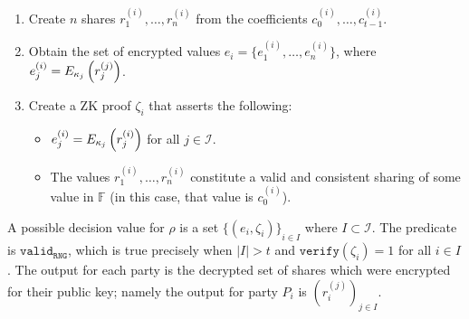 \documentclass{article}
\theoremstyle{remark}
\newcommand{\F}{\mathbb{F}}
\begin{document}
\begin{enumerate}
	\item Create $n$ shares $r_1^{(i)}, \ldots, r_n^{(i)}$ from the
		coefficients $c_0^{(i)}, \ldots, c_{t-1}^{(i)}$.
	\item Obtain the set of encrypted values $e_i = \{e_1^{(i)},
		\ldots, e_n^{(i)}\}$, where $e_j^{(i)} =
		E_{\kappa_j}\left(r_j^{(j)}\right)$.
	\item Create a ZK proof $\zeta_i$ that asserts the following:
		\begin{itemize}
			\item $e_j^{(i)} = E_{\kappa_j}\left(r_j^{(i)}\right)$ for all
				$j \in \mathcal{I}$.
			\item The values $r_1^{(i)}, \ldots, r_n^{(i)}$ constitute
				a valid and consistent sharing of some value in $\F$ (in this
				case, that value is $c_0^{(i)}$).
		\end{itemize}
\end{enumerate}

A possible decision value for $\rho$ is a set ${\{(e_i, \zeta_i)\}}_{i \in I}$
where $I \subset \mathcal{I}$. The predicate is $\texttt{valid}_\texttt{RNG}$,
which is true precisely when $|I| > t$ and $\texttt{verify}(\zeta_i) = 1$ for
all $i \in I$. The output for each party is the decrypted set of shares which
were encrypted for their public key; namely the output for party $P_i$ is
${(r_i^{(j)})}_{j \in I}$.
\end{document}
